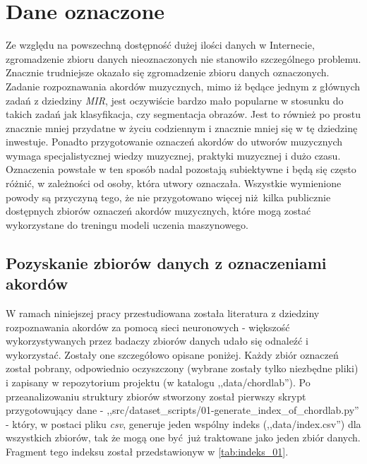 \section{Dane oznaczone}

Ze względu na powszechną dostępność dużej ilości danych w Internecie, zgromadzenie zbioru danych
nieoznaczonych nie stanowiło szczególnego problemu. Znacznie trudniejsze okazało się zgromadzenie
zbioru danych oznaczonych. Zadanie rozpoznawania akordów muzycznych, mimo iż będące jednym z
głównych zadań z dziedziny \emph{MIR}, jest oczywiście bardzo mało popularne w stosunku do takich
zadań jak klasyfikacja, czy segmentacja obrazów. Jest to również po prostu znacznie mniej przydatne
w życiu codziennym i znacznie mniej się w tę dziedzinę inwestuje. Ponadto przygotowanie oznaczeń
akordów do utworów muzycznych wymaga specjalistycznej wiedzy muzycznej, praktyki muzycznej i dużo
czasu. Oznaczenia powstałe w ten sposób nadal pozostają subiektywne i będą się często różnić, w
zależności od osoby, która utwory oznaczała. Wszystkie wymienione powody są przyczyną tego, że nie
przygotowano więcej niż kilka publicznie dostępnych zbiorów oznaczeń akordów muzycznych, które mogą
zostać wykorzystane do treningu modeli uczenia maszynowego.


\subsection{Pozyskanie zbiorów danych z oznaczeniami akordów}

W ramach niniejszej pracy przestudiowana została literatura z dziedziny rozpoznawania akordów za
pomocą sieci neuronowych - większość wykorzystywanych przez badaczy zbiorów danych udało się
odnaleźć i wykorzystać. Zostały one szczegółowo opisane poniżej. Każdy zbiór oznaczeń został
pobrany, odpowiednio oczyszczony (wybrane zostały tylko niezbędne pliki) i zapisany w repozytorium
projektu (w katalogu ,,data/chordlab''). Po przeanalizowaniu struktury zbiorów stworzony został
pierwszy skrypt przygotowujący dane - ,,src/dataset\_scripts/01-generate\_index\_of\_chordlab.py'' -
który, w postaci pliku \emph{csv}, generuje jeden wspólny indeks (,,data/index.csv'') dla wszystkich
zbiorów, tak że mogą one być już traktowane jako jeden zbiór danych. Fragment tego indeksu został
przedstawionyw w \ref{tab:indeks_01}.


